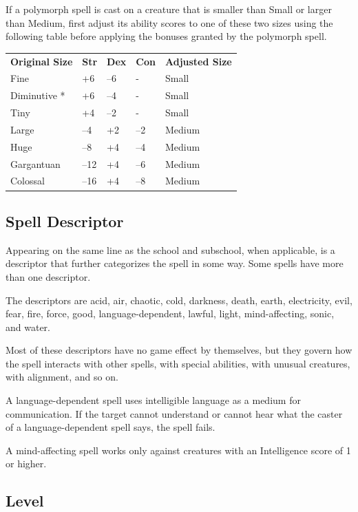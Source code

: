 If a polymorph spell is cast on a creature that is smaller than Small or larger than Medium, first adjust its ability scores to one of these two sizes using the following table before applying the bonuses granted by the polymorph spell.

\begin{table}
\sffamily
 \begin{tabular}{lllll}
\textbf{Original Size} & \textbf{Str} & \textbf{Dex} & \textbf{Con} & \textbf{Adjusted Size}\\
Fine & +6 & --6 & - & Small\\
Diminutive * & +6 & --4 & - & Small\\
Tiny & +4 & --2 & - & Small\\
Large & --4 & +2 & --2 & Medium\\
Huge & --8 & +4 & --4 & Medium\\
Gargantuan & --12 & +4 & --6 & Medium\\
Colossal & --16 & +4 & --8 & Medium\\
 \end{tabular}

\end{table}

				
\subsection{Spell Descriptor}

				
Appearing on the same line as the school and subschool, when applicable, is a descriptor that further categorizes the spell in some way. Some spells have more than one descriptor.
				
The descriptors are acid, air, chaotic, cold, darkness, death, earth, electricity, evil, fear, fire, force, good, language-dependent, lawful, light, mind-affecting, sonic, and water.
				
Most of these descriptors have no game effect by themselves, but they govern how the spell interacts with other spells, with special abilities, with unusual creatures, with alignment, and so on.
				
A language-dependent spell uses intelligible language as a medium for communication. If the target cannot understand or cannot hear what the caster of a language-dependent spell says, the spell fails.
				
A mind-affecting spell works only against creatures with an Intelligence score of 1 or higher.
				
\subsection{Level}

